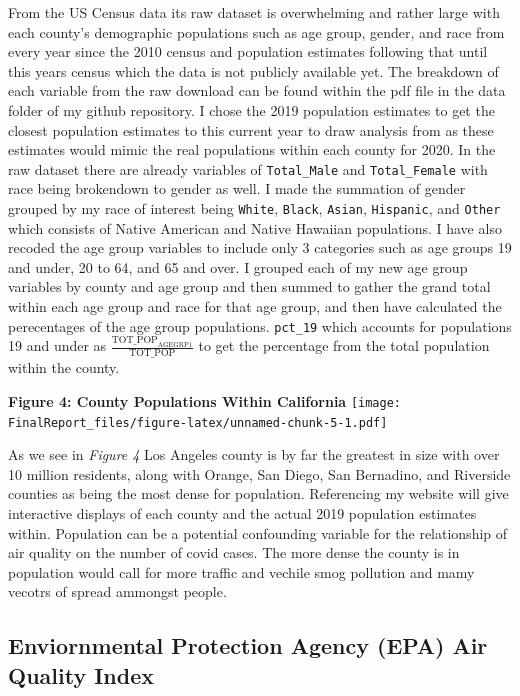 \documentclass[
]{article}
\begin{document}
From the US Census data its raw dataset is overwhelming and rather large
with each county's demographic populations such as age group, gender,
and race from every year since the 2010 census and population estimates
following that until this years census which the data is not publicly
available yet. The breakdown of each variable from the raw download can
be found within the pdf file in the data folder of my github repository.
I chose the 2019 population estimates to get the closest population
estimates to this current year to draw analysis from as these estimates
would mimic the real populations within each county for 2020. In the raw
dataset there are already variables of \texttt{Total\_Male} and
\texttt{Total\_Female} with race being brokendown to gender as well. I
made the summation of gender grouped by my race of interest being
\texttt{White}, \texttt{Black}, \texttt{Asian}, \texttt{Hispanic}, and
\texttt{Other} which consists of Native American and Native Hawaiian
populations. I have also recoded the age group variables to include only
3 categories such as age groups 19 and under, 20 to 64, and 65 and over.
I grouped each of my new age group variables by county and age group and
then summed to gather the grand total within each age group and race for
that age group, and then have calculated the perecentages of the age
group populations. \texttt{pct\_19} which accounts for populations 19
and under as \(\frac{\text{TOT_POP}_\text{AGEGRP1}}{\text{TOT_POP}}\) to
get the percentage from the total population within the county.

\textbf{Figure 4: County Populations Within California}
\texttt{[image: FinalReport\_files/figure-latex/unnamed-chunk-5-1.pdf]}

As we see in \emph{Figure 4} Los Angeles county is by far the greatest
in size with over 10 million residents, along with Orange, San Diego,
San Bernadino, and Riverside counties as being the most dense for
population. Referencing my website will give interactive displays of
each county and the actual 2019 population estimates within. Population
can be a potential confounding variable for the relationship of air
quality on the number of covid cases. The more dense the county is in
population would call for more traffic and vechile smog pollution and
mamy vecotrs of spread ammongst people.

\hypertarget{enviornmental-protection-agency-epa-air-quality-index}{%
\subsection{Enviornmental Protection Agency (EPA) Air Quality
Index}\label{enviornmental-protection-agency-epa-air-quality-index}}
\end{document}
